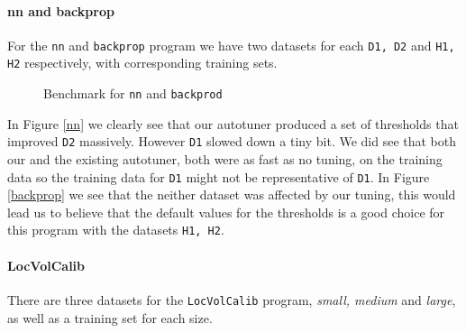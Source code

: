 \paragraph{nn and backprop}
For the \texttt{nn} and \texttt{backprop} program we have two datasets for each \texttt{D1, D2} and \texttt{H1, H2} respectively, with corresponding training sets. 
\begin{figure}[h]
	\centering
	\hspace{5mm}
	\caption{Benchmark for \texttt{nn} and \texttt{backprod}}
	\label{NNandBackprop}
\end{figure}
In Figure \ref{nn} we clearly see that our autotuner produced a set of thresholds that improved \texttt{D2} massively. However \texttt{D1} slowed down a tiny bit. We did see that both our and the existing autotuner, both were as fast as no tuning, on the training data 
so the training data for \texttt{D1} might not be representative of \texttt{D1}. In Figure \ref{backprop} we see that the neither dataset was affected by our tuning, this would lead us to believe that the default values for the thresholds is a good choice for this program with the datasets \texttt{H1, H2}.

\paragraph{LocVolCalib}
There are three datasets for the \texttt{LocVolCalib} program, \textit{small,
medium} and \textit{large}, as well as a training set for each size.

